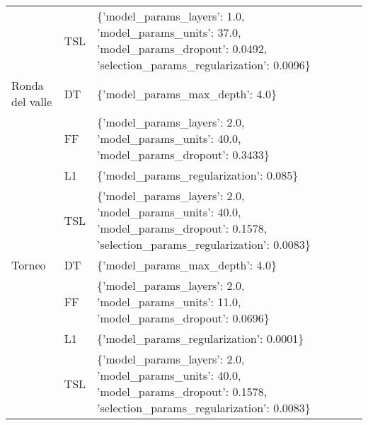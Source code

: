 \begin{tabular}{lll}
       & TSL &  \{'model\_params\_layers': 1.0, 'model\_params\_units': 37.0, 'model\_params\_dropout': 0.0492, 'selection\_params\_regularization': 0.0096\} \\
Ronda del valle & DT &                                                                                                      \{'model\_params\_max\_depth': 4.0\} \\
       & FF &                                             \{'model\_params\_layers': 2.0, 'model\_params\_units': 40.0, 'model\_params\_dropout': 0.3433\} \\
       & L1 &                                                                                               \{'model\_params\_regularization': 0.085\} \\
       & TSL &  \{'model\_params\_layers': 2.0, 'model\_params\_units': 40.0, 'model\_params\_dropout': 0.1578, 'selection\_params\_regularization': 0.0083\} \\
Torneo & DT &                                                                                                      \{'model\_params\_max\_depth': 4.0\} \\
       & FF &                                             \{'model\_params\_layers': 2.0, 'model\_params\_units': 11.0, 'model\_params\_dropout': 0.0696\} \\
       & L1 &                                                                                              \{'model\_params\_regularization': 0.0001\} \\
       & TSL &  \{'model\_params\_layers': 2.0, 'model\_params\_units': 40.0, 'model\_params\_dropout': 0.1578, 'selection\_params\_regularization': 0.0083\} \\
\bottomrule
\end{tabular}
